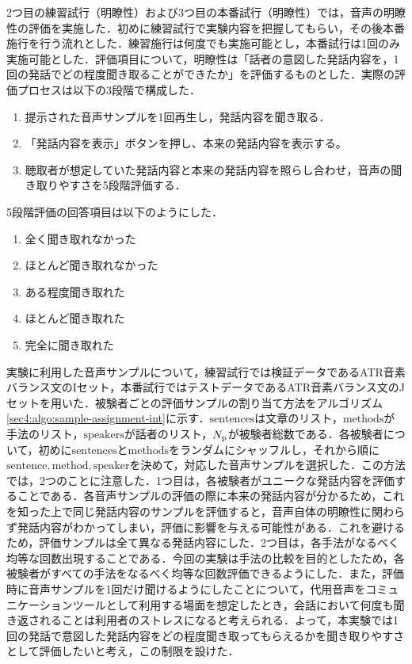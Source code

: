 2つ目の練習試行（明瞭性）および3つ目の本番試行（明瞭性）では，音声の明瞭性の評価を実施した．初めに練習試行で実験内容を把握してもらい，その後本番施行を行う流れとした．練習施行は何度でも実施可能とし，本番試行は1回のみ実施可能とした．評価項目について，明瞭性は「話者の意図した発話内容を，1回の発話でどの程度聞き取ることができたか」を評価するものとした．実際の評価プロセスは以下の3段階で構成した．
\begin{enumerate}
    \item 提示された音声サンプルを1回再生し，発話内容を聞き取る．
    \item 「発話内容を表示」ボタンを押し、本来の発話内容を表示する。
    \item 聴取者が想定していた発話内容と本来の発話内容を照らし合わせ，音声の聞き取りやすさを5段階評価する．
\end{enumerate}
5段階評価の回答項目は以下のようにした．
\begin{enumerate}
    \item 全く聞き取れなかった
    \item ほとんど聞き取れなかった
    \item ある程度聞き取れた
    \item ほとんど聞き取れた
    \item 完全に聞き取れた
\end{enumerate}
実験に利用した音声サンプルについて，練習試行では検証データであるATR音素バランス文のIセット，本番試行ではテストデータであるATR音素バランス文のJセットを用いた．被験者ごとの評価サンプルの割り当て方法をアルゴリズム\ref{sec4:algo:sample-assignment-int}に示す．$\text{sentences}$は文章のリスト，$\text{methods}$が手法のリスト，$\text{speakers}$が話者のリスト，$N_{\text{p}}$が被験者総数である．各被験者について，初めに$\text{sentences}$と$\text{methods}$をランダムにシャッフルし，それから順に$\text{sentence}, \text{method}, \text{speaker}$を決めて，対応した音声サンプルを選択した．この方法では，2つのことに注意した．1つ目は，各被験者がユニークな発話内容を評価することである．各音声サンプルの評価の際に本来の発話内容が分かるため，これを知った上で同じ発話内容のサンプルを評価すると，音声自体の明瞭性に関わらず発話内容がわかってしまい，評価に影響を与える可能性がある．これを避けるため，評価サンプルは全て異なる発話内容にした．2つ目は，各手法がなるべく均等な回数出現することである．今回の実験は手法の比較を目的としたため，各被験者がすべての手法をなるべく均等な回数評価できるようにした．また，評価時に音声サンプルを1回だけ聞けるようにしたことについて，代用音声をコミュニケーションツールとして利用する場面を想定したとき，会話において何度も聞き返されることは利用者のストレスになると考えられる．よって，本実験では1回の発話で意図した発話内容をどの程度聞き取ってもらえるかを聞き取りやすさとして評価したいと考え，この制限を設けた．
